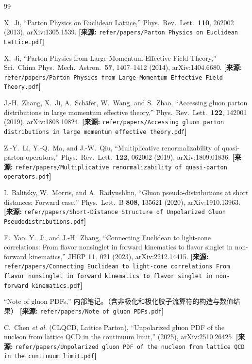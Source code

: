 \documentclass[12pt,a4paper]{ctexart}
\theoremstyle{definition}
\begin{document}
\begin{thebibliography}{99}

X.~Ji,
``Parton Physics on Euclidean Lattice,''
Phys.\ Rev.\ Lett.\ \textbf{110}, 262002 (2013), arXiv:1305.1539.
\quad\textbf{[来源:} \texttt{refer/papers/Parton Physics on Euclidean Lattice.pdf}\textbf{]}

X.~Ji,
``Parton Physics from Large-Momentum Effective Field Theory,''
Sci.\ China Phys.\ Mech.\ Astron.\ \textbf{57}, 1407--1412 (2014), arXiv:1404.6680.
\quad\textbf{[来源:} \texttt{refer/papers/Parton Physics from Large-Momentum Effective Field Theory.pdf}\textbf{]}

J.-H.~Zhang, X.~Ji, A.~Sch\"afer, W.~Wang, and S.~Zhao,
``Accessing gluon parton distributions in large momentum effective theory,''
Phys.\ Rev.\ Lett.\ \textbf{122}, 142001 (2019), arXiv:1808.10824.
\quad\textbf{[来源:} \texttt{refer/papers/Accessing gluon parton distributions in large momentum effective theory.pdf}\textbf{]}

Z.-Y.~Li, Y.-Q.~Ma, and J.-W.~Qiu,
``Multiplicative renormalizability of quasi-parton operators,''
Phys.\ Rev.\ Lett.\ \textbf{122}, 062002 (2019), arXiv:1809.01836.
\quad\textbf{[来源:} \texttt{refer/papers/Multiplicative renormalizability of quasi-parton operators.pdf}\textbf{]}

I.~Balitsky, W.~Morris, and A.~Radyushkin,
``Gluon pseudo-distributions at short distances: Forward case,''
Phys.\ Lett.\ B \textbf{808}, 135621 (2020), arXiv:1910.13963.
\quad\textbf{[来源:} \texttt{refer/papers/Short-Distance Structure of Unpolarized Gluon Pseudodistributions.pdf}\textbf{]}

F.~Yao, Y.~Ji, and J.-H.~Zhang,
``Connecting Euclidean to light-cone correlations: From flavor nonsinglet in forward kinematics to flavor singlet in non-forward kinematics,''
JHEP \textbf{11}, 021 (2023), arXiv:2212.14415.
\quad\textbf{[来源:} \texttt{refer/papers/Connecting Euclidean to light-cone correlations From flavor nonsinglet in forward kinematics to flavor singlet in non-forward kinematics.pdf}\textbf{]}

``Note of gluon PDFs,''
内部笔记。（含非极化和极化胶子流算符的构造与数值结果）
\quad\textbf{[来源:} \texttt{refer/papers/Note of gluon PDFs.pdf}\textbf{]}

C.~Chen \textit{et al.} (CLQCD, Lattice Parton),
``Unpolarized gluon PDF of the nucleon from lattice QCD in the continuum limit,''
(2025), arXiv:2510.26425.
\quad\textbf{[来源:} \texttt{refer/papers/Unpolarized gluon PDF of the nucleon from lattice QCD in the continuum limit.pdf}\textbf{]}


\end{thebibliography}
\end{document}
